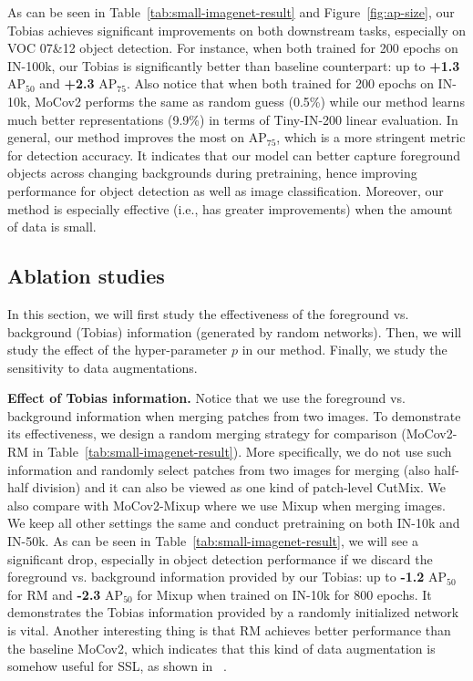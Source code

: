 \documentclass[letterpaper]{article}
\begin{document}
As can be seen in Table~\ref{tab:small-imagenet-result} and Figure~\ref{fig:ap-size}, our Tobias achieves significant improvements on both downstream tasks, especially on VOC 07\&12 object detection. For instance, when both trained for 200 epochs on IN-100k, our Tobias is significantly better than baseline counterpart: up to \textbf{+1.3} $\text{AP}_{50}$ and \textbf{+2.3} $\text{AP}_{75}$. Also notice that when both trained for 200 epochs on IN-10k, MoCov2 performs the same as random guess (0.5\%) while our method learns much better representations (9.9\%) in terms of Tiny-IN-200 linear evaluation. In general, our method improves the most on $\text{AP}_{75}$, which is a more stringent metric for detection accuracy. It indicates that our model can better capture foreground objects across changing backgrounds during pretraining, hence improving performance for object detection as well as image classification. Moreover, our method is especially effective (i.e., has greater improvements) when the amount of data is small.



\subsection{Ablation studies} \label{sec:exp3}

In this section, we will first study the effectiveness of the foreground vs. background (Tobias) information (generated by random networks). Then, we will study the effect of the hyper-parameter $p$ in our method. Finally, we study the sensitivity to data augmentations.

\textbf{Effect of Tobias information.} Notice that we use the foreground vs. background information when merging patches from two images. To demonstrate its effectiveness, we design a random merging strategy for comparison (MoCov2-RM in Table~\ref{tab:small-imagenet-result}). More specifically, we do not use such information and randomly select patches from two images for merging (also half-half division) and it can also be viewed as one kind of patch-level CutMix. We also compare with MoCov2-Mixup where we use Mixup when merging images. We keep all other settings the same and conduct pretraining on both IN-10k and IN-50k. As can be seen in Table~\ref{tab:small-imagenet-result}, we will see a significant drop, especially in object detection performance if we discard the foreground vs. background information provided by our Tobias: up to \textbf{-1.2} $\text{AP}_{50}$ for RM and \textbf{-2.3} $\text{AP}_{50}$ for Mixup when trained on IN-10k for 800 epochs. It demonstrates the Tobias information provided by a randomly initialized network is vital. Another interesting thing is that RM achieves better performance than the baseline MoCov2, which indicates that this kind of data augmentation is somehow useful for SSL, as shown in ~\citep{unmix:shen:arxiv20}.
\end{document}
